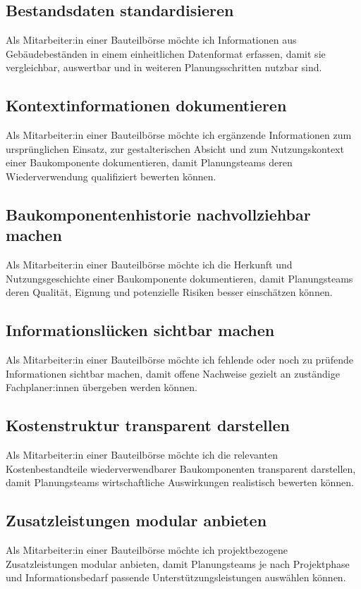 \subsection{Bestandsdaten standardisieren}
\label{us:bb-05} Als Mitarbeiter:in einer Bauteilbörse möchte ich Informationen aus Gebäudebeständen in einem einheitlichen Datenformat erfassen, damit sie vergleichbar, auswertbar und in weiteren Planungsschritten nutzbar sind.

\subsection{Kontextinformationen dokumentieren}
\label{us:bb-06} Als Mitarbeiter:in einer Bauteilbörse möchte ich ergänzende Informationen zum ursprünglichen Einsatz, zur gestalterischen Absicht und zum Nutzungskontext einer Baukomponente dokumentieren, damit Planungsteams deren Wiederverwendung qualifiziert bewerten können.

\subsection{Baukomponentenhistorie nachvollziehbar machen}
\label{us:bb-07} Als Mitarbeiter:in einer Bauteilbörse möchte ich die Herkunft und Nutzungsgeschichte einer Baukomponente dokumentieren, damit Planungsteams deren Qualität, Eignung und potenzielle Risiken besser einschätzen können.

\subsection{Informationslücken sichtbar machen}
\label{us:bb-08} Als Mitarbeiter:in einer Bauteilbörse möchte ich fehlende oder noch zu prüfende Informationen sichtbar machen, damit offene Nachweise gezielt an zuständige Fachplaner:innen übergeben werden können.

\subsection{Kostenstruktur transparent darstellen}
\label{us:bb-09} Als Mitarbeiter:in einer Bauteilbörse möchte ich die relevanten Kostenbestandteile wiederverwendbarer Baukomponenten transparent darstellen, damit Planungsteams wirtschaftliche Auswirkungen realistisch bewerten können.

\subsection{Zusatzleistungen modular anbieten}
\label{us:bb-10} Als Mitarbeiter:in einer Bauteilbörse möchte ich projektbezogene Zusatzleistungen modular anbieten, damit Planungsteams je nach Projektphase und Informationsbedarf passende Unterstützungsleistungen auswählen können.

